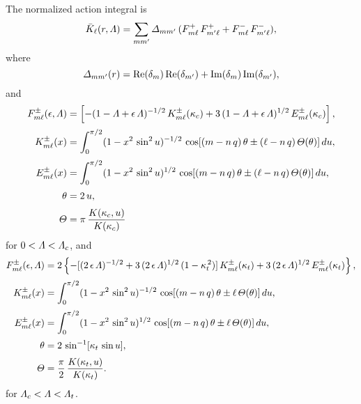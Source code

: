 \documentclass[12pt,prb,aps,notitlepage]{revtex4-1}
\begin{document}
The normalized action integral is
\begin{align}
\bar{K}_\ell(r,{\mit\Lambda}) =\sum_{mm'}{\mit\Delta}_{mm'}\,(F^+_{m\ell}\,F^+_{m'\ell} +F^-_{m\ell}\,F^-_{m'\ell}),
\end{align}
where
\begin{equation}
{\mit\Delta}_{mm'} (r)= {\rm Re}(\delta_m)\,{\rm Re}(\delta_{m'})+ {\rm Im}(\delta_m)\,{\rm Im}(\delta_{m'}),
\end{equation}
and
\begin{align}
F_{m\ell}^\pm(\epsilon,{\mit\Lambda}) &= \left[-(1-{\mit\Lambda}+\epsilon\,{\mit\Lambda})^{-1/2}\,K^\pm_{m\ell}(\kappa_c) + 3\,(1-{\mit\Lambda}+\epsilon\,{\mit\Lambda})^{1/2}\,
E^\pm_{m\ell}(\kappa_c)\right],\\[0.5ex]
K^\pm_{m\ell}(x) &= \int_0^{\pi/2} (1-x^2\,\sin^2 u)^{-1/2}\,\cos[(m-n\,q)\,\theta \pm (\ell -n\,q)\,{\mit\Theta}(\theta)]\,du,\\[0.5ex]
E^\pm_{m\ell}(x) &= \int_0^{\pi/2} (1-x^2\,\sin^2 u)^{1/2}\,\cos[(m-n\,q)\,\theta \pm (\ell -n\,q)\,{\mit\Theta}(\theta)]\,du,\\[0.5ex]
 \theta&=2\,u,\\[0.5ex]
 {\mit\Theta} &= \pi\,\frac{K(\kappa_c,u)}{K(\kappa_c)}
 \end{align}
 for $0<{\mit\Lambda}<{\mit\Lambda}_c$,
 and 
 \begin{align}
F_{m\ell}^\pm(\epsilon,{\mit\Lambda}) &= 2\left\{-[(2\,\epsilon\,{\mit\Lambda})^{-1/2}+3\,(2\,\epsilon\,{\mit\Lambda})^{1/2}\,(1-\kappa_t^{\,2})]\,K^\pm_{m\ell}(\kappa_t) + 3\,(2\,\epsilon\,{\mit\Lambda})^{1/2}\,E^\pm_{m\ell}(\kappa_t)\right\},\\[0.5ex]
K^\pm_{m\ell}(x) &= \int_0^{\pi/2} (1-x^2\,\sin^2 u)^{-1/2}\,\cos[(m-n\,q)\,\theta \pm \ell\,{\mit\Theta}(\theta)]\,du,\\[0.5ex]
E^\pm_{m\ell}(x) &= \int_0^{\pi/2} (1-x^2\,\sin^2 u)^{1/2}\,\cos[(m-n\,q)\,\theta \pm \ell \,{\mit\Theta}(\theta)]\,du,\\[0.5ex]
\theta&=2\,\sin^{-1}[\kappa_t\,\sin u],\\[0.5ex]
{\mit\Theta}&= \frac{\pi}{2}\,\frac{K(\kappa_t,u)}{K(\kappa_t)}.
\end{align}
for ${\mit\Lambda}_c<{\mit\Lambda}<{\mit\Lambda}_t$. 
\end{document}
